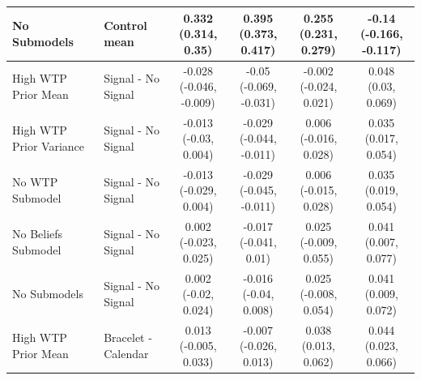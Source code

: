 \documentclass[
]{article}
\begin{document}
\begin{table}
{\begin{tabular}[t]{llcccc}
No Submodels & Control mean & \makecell[c]{0.332\\(0.314, 0.35)} & \makecell[c]{0.395\\(0.373, 0.417)} & \makecell[c]{0.255\\(0.231, 0.279)} & \makecell[c]{-0.14\\(-0.166, -0.117)}\\
\midrule
High WTP Prior Mean & Signal - No Signal & \makecell[c]{-0.028\\(-0.046, -0.009)} & \makecell[c]{-0.05\\(-0.069, -0.031)} & \makecell[c]{-0.002\\(-0.024, 0.021)} & \makecell[c]{0.048\\(0.03, 0.069)}\\
High WTP Prior Variance & Signal - No Signal & \makecell[c]{-0.013\\(-0.03, 0.004)} & \makecell[c]{-0.029\\(-0.044, -0.011)} & \makecell[c]{0.006\\(-0.016, 0.028)} & \makecell[c]{0.035\\(0.017, 0.054)}\\
No WTP Submodel & Signal - No Signal & \makecell[c]{-0.013\\(-0.029, 0.004)} & \makecell[c]{-0.029\\(-0.045, -0.011)} & \makecell[c]{0.006\\(-0.015, 0.028)} & \makecell[c]{0.035\\(0.019, 0.054)}\\
No Beliefs Submodel & Signal - No Signal & \makecell[c]{0.002\\(-0.023, 0.025)} & \makecell[c]{-0.017\\(-0.041, 0.01)} & \makecell[c]{0.025\\(-0.009, 0.055)} & \makecell[c]{0.041\\(0.007, 0.077)}\\
No Submodels & Signal - No Signal & \makecell[c]{0.002\\(-0.02, 0.024)} & \makecell[c]{-0.016\\(-0.04, 0.008)} & \makecell[c]{0.025\\(-0.008, 0.054)} & \makecell[c]{0.041\\(0.009, 0.072)}\\
High WTP Prior Mean & Bracelet - Calendar & \makecell[c]{0.013\\(-0.005, 0.033)} & \makecell[c]{-0.007\\(-0.026, 0.013)} & \makecell[c]{0.038\\(0.013, 0.062)} & \makecell[c]{0.044\\(0.023, 0.066)}\\

\end{tabular}}
\end{table}
\end{document}
